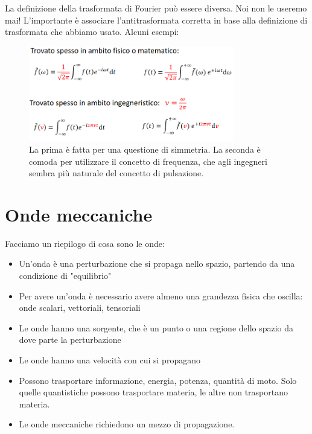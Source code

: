 \begin{note}
	La definizione della trasformata di Fourier può essere diversa. Noi non le useremo mai! L'importante è associare l'antitrasformata corretta in base alla definizione di trasformata che abbiamo usato. Alcuni esempi:
	\begin{figure}[H]
		\centering
		\includegraphics[width=0.8\textwidth]{2024-03-07-09-57-28.png}
		\caption{La prima è fatta per una questione di simmetria. La seconda è comoda per utilizzare il concetto di frequenza, che agli ingegneri sembra più naturale del concetto di pulsazione.}
	\end{figure}
\end{note}

\chapter{Onde meccaniche}

Facciamo un riepilogo di cosa sono le onde:
\begin{itemize}
	
	\item Un'onda è una perturbazione che si propaga nello spazio, partendo da una condizione di "equilibrio"
	\item Per avere un'onda è necessario avere almeno una grandezza fisica che oscilla: onde scalari, vettoriali, tensoriali
	\item Le onde hanno una sorgente, che è un punto o una regione dello spazio da dove parte la perturbazione
	\item Le onde hanno una velocità con cui si propagano
	\item Possono trasportare informazione, energia, potenza, quantità di moto. Solo quelle quantistiche possono trasportare materia, le altre non trasportano materia.
	\item Le onde meccaniche richiedono un mezzo di propagazione.
\end{itemize}

